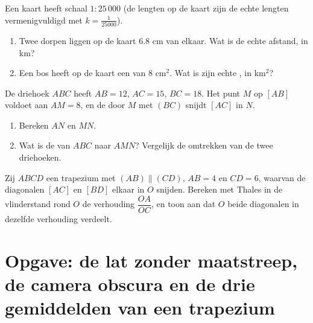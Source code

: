\begin{exercise}[$\star\star$]\label{exo:g9:thales:7}
Een kaart heeft schaal $1 : 25\,000$ (de lengten op de kaart zijn de echte lengten
vermenigvuldigd met $k = \frac{1}{25000}$).
\begin{enumerate}
  \item Twee dorpen liggen op de kaart $6.8$ cm van elkaar. Wat is de echte
        afstand, in km?
  \item Een bos heeft op de kaart een  van $8$ cm$^2$. Wat is zijn echte
        , in km$^2$?
\end{enumerate}
\end{exercise}

\begin{exercise}[$\star\star$]\label{exo:g9:thales:8}
De driehoek $ABC$ heeft $AB = 12$, $AC = 15$, $BC = 18$. Het punt $M$ op $[AB]$
voldoet aan $AM = 8$, en de  door $M$  met $(BC)$ snijdt $[AC]$ in
$N$.
\begin{enumerate}
  \item Bereken $AN$ en $MN$.
  \item Wat is de  van $ABC$ naar $AMN$? Vergelijk de omtrekken van de
        twee driehoeken.
\end{enumerate}
\end{exercise}

\begin{exercise}[$\star\star\star$]\label{exo:g9:thales:9}
Zij $ABCD$ een trapezium met $(AB) \parallel (CD)$, $AB = 4$ en $CD = 6$, waarvan
de diagonalen $[AC]$ en $[BD]$ elkaar in $O$ snijden. Bereken met Thales in de
vlinderstand rond $O$ de verhouding $\dfrac{OA}{OC}$, en toon aan dat $O$ beide
diagonalen in dezelfde verhouding verdeelt.
\end{exercise}

\section{Opgave: de lat zonder maatstreep, de camera obscura en de drie
gemiddelden van een trapezium}

